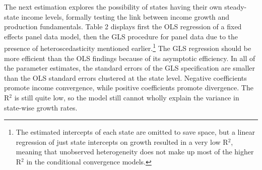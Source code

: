 \documentclass[a4paper, 11pt]{article}
\begin{document}
	The next estimation explores the possibility of states having their own steady-state income levels, formally testing the link between income growth and production fundamentals.  Table 2 displays first the OLS regression of a fixed effects panel data model, then the GLS procedure for panel data due to the presence of heteroscedasticity mentioned earlier.\footnote{The estimated intercepts of each state are omitted to save space, but a linear regression of just state intercepts on growth resulted in a very low R$^{2}$, meaning that unobserved heterogeneity does not make up most of the higher R$^{2}$ in the conditional convergence models.}  The GLS regression should be more efficient than the OLS findings because of its asymptotic efficiency.  In all of the parameter estimates, the standard errors of the GLS specification are smaller than the OLS standard errors clustered at the state level.  Negative coefficients promote income convergence, while positive coefficients promote divergence.  The R$^{2}$ is still quite low, so the model still cannot wholly explain the variance in state-wise growth rates.\par
\end{document}
